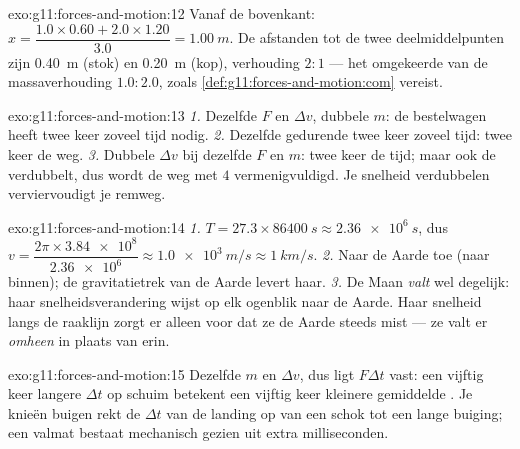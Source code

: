 \begin{solution}{exo:g11:forces-and-motion:12}
Vanaf de bovenkant: $x = \dfrac{1.0 \times 0.60 + 2.0 \times 1.20}{3.0}
= \qty{1.00}{m}$. De afstanden tot de twee deelmiddelpunten zijn
\qty{0.40}{m} (stok) en \qty{0.20}{m} (kop), verhouding $2 : 1$ --- het
omgekeerde van de massaverhouding $1.0 : 2.0$, zoals
\cref{def:g11:forces-and-motion:com} vereist.
\end{solution}

\begin{solution}{exo:g11:forces-and-motion:13}
\emph{1.} Dezelfde $F$ en $\Delta v$, dubbele $m$: de bestelwagen heeft
twee keer zoveel tijd nodig. \emph{2.} Dezelfde 
gedurende twee keer zoveel tijd: twee keer de weg. \emph{3.} Dubbele
$\Delta v$ bij dezelfde $F$ en $m$: twee keer de tijd; maar ook de
 verdubbelt, dus wordt de weg met $4$
vermenigvuldigd. Je snelheid verdubbelen verviervoudigt je remweg.
\end{solution}

\begin{solution}{exo:g11:forces-and-motion:14}
\emph{1.} $T = 27.3 \times \qty{86400}{s} \approx \qty{2.36e6}{s}$, dus
$v = \dfrac{2\pi \times \num{3.84e8}}{\num{2.36e6}} \approx
\qty{1.0e3}{m/s} \approx \qty{1}{km/s}$. \emph{2.} Naar de Aarde toe
(naar binnen); de gravitatietrek van de Aarde levert haar. \emph{3.} De
Maan \emph{valt} wel degelijk: haar snelheidsverandering wijst op elk
ogenblik naar de Aarde. Haar snelheid langs de raaklijn zorgt er alleen
voor dat ze de Aarde steeds mist --- ze valt er \emph{omheen} in plaats
van erin.
\end{solution}

\begin{solution}{exo:g11:forces-and-motion:15}
Dezelfde $m$ en $\Delta v$, dus ligt $F\Delta t$ vast: een vijftig keer
langere $\Delta t$ op schuim betekent een vijftig keer kleinere
gemiddelde . Je knieën buigen rekt de $\Delta t$ van de landing op
van een schok tot een lange buiging; een valmat bestaat mechanisch gezien
uit extra milliseconden.
\end{solution}

